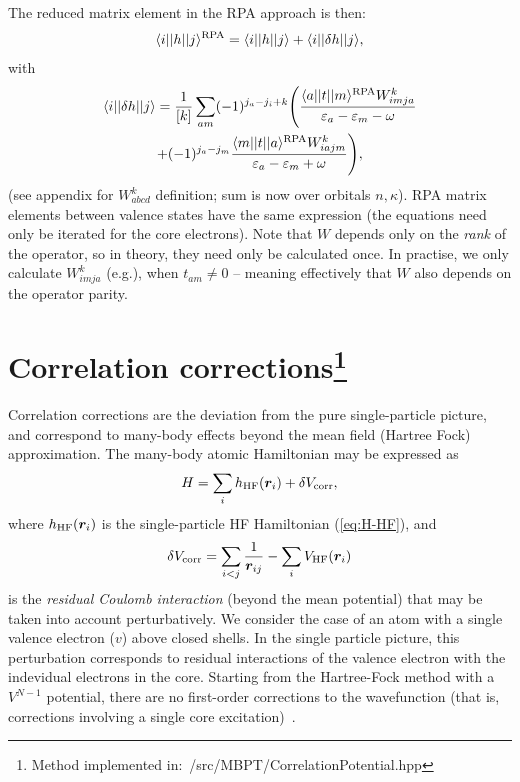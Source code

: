 \documentclass[10pt,twocolumn,a4paper]{article}%
\newcommand{\bra}[1]{\ensuremath{\langle #1|}}	%
\newcommand{\ket}[1]{\ensuremath{|#1\rangle}}	%
\renewcommand{\v}[1]{\ensuremath{\boldsymbol{#1}}}		%
\newcommand{\be}{\begin{equation}}
\newcommand{\ee}{\end{equation}}
\def\en{\ensuremath{\varepsilon}}
\renewcommand{\k}{\ensuremath{\kappa}}
\begin{document}
The reduced matrix element in the RPA approach is then:
\be
\bra{i}|h|\ket{j}^{\rm RPA} = \bra{i}|h|\ket{j} + \bra{i}|\delta h|\ket{j},
\ee
with
\begin{multline}
\bra{i}|\delta h|\ket{j} = 
\frac{1}{[k]}\sum_{am}(-1)^{j_a-j_i+k}\Bigg(
 \frac{\bra{a}|t|\ket{m}^{\rm RPA}W^k_{imja}}{\en_a-\en_m-\omega}\\
+ (-1)^{j_a-j_m}\frac{\bra{m}|t|\ket{a}^{\rm RPA}W^k_{iajm}}{\en_a-\en_m+\omega}
\Bigg),
\end{multline}
(see appendix for $W^k_{abcd}$ definition; sum is now over {\rm orbitals $n,\k$}).
RPA matrix elements between valence states have the same expression (the equations need only be iterated for the core electrons).
Note that $W$ depends only on the {\em rank} of the operator, so in theory, they need only be calculated once.
In practise, we only calculate $W^k_{imja}$ (e.g.), when $t_{am}\neq0$ -- meaning effectively that $W$ also depends on the operator parity.










\section[Correlation corrections]{Correlation corrections\footnote{Method implemented in:~/src/MBPT/CorrelationPotential.hpp}}

Correlation corrections are the deviation from the pure single-particle picture, and correspond to many-body effects beyond the mean field (Hartree Fock) approximation.
The many-body atomic Hamiltonian may be expressed as
\be
H = \sum_i h_{\rm HF}(\v{r}_i) + \delta V_{\rm corr},
\ee
where $h_{\rm HF}(\v{r}_i)$ is the single-particle HF Hamiltonian (\ref{eq:H-HF}), and
\be\label{eq:residCoul}
\delta V_{\rm corr} = \sum_{i<j}\frac{1}{\v{r}_{ij}} - \sum_iV_{\rm HF}(\v{r}_i)
\ee
is the {\em residual Coulomb interaction} (beyond the mean potential) that may be taken into account perturbatively.
We consider the case of an atom with a single valence electron ($v$) above closed shells.
In the single particle picture, this perturbation corresponds to residual interactions of the valence electron with the indevidual electrons in the core.
Starting from the Hartree-Fock method with a $V^{N-1}$ potential, there are no first-order corrections to the wavefunction (that is, corrections involving a single core excitation)~\cite{Lindgren1986}.
\end{document}
